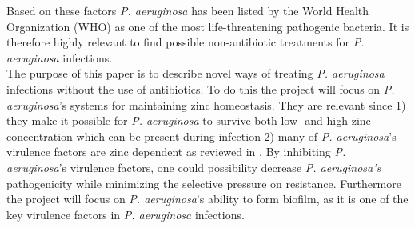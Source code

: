 Based on these factors \textit{P. aeruginosa} has been listed by the World Health Organization (WHO) as one of the most life-threatening pathogenic bacteria\cite{PRIORITIZATIONTUBERCULOSIS}. It is therefore highly relevant to find possible non-antibiotic treatments for \textit{P. aeruginosa} infections.\\ 
The purpose of this paper is to describe novel ways of treating \textit{P. aeruginosa} infections without the use of antibiotics. To do this the project will focus on \textit{P. aeruginosa}'s systems for maintaining zinc homeostasis. They are relevant since 1) they make it possible for \textit{P. aeruginosa} to survive both low- and high zinc concentration which can be present during infection 2) many of \textit{P. aeruginosa}'s virulence factors are zinc dependent as reviewed in \cite{Gonzalez2019PseudomonasPathogen}. By inhibiting \textit{P. aeruginosa}'s virulence factors, one could possibility decrease \textit{P. aeruginosa's} pathogenicity while minimizing the selective pressure on resistance. Furthermore the project will focus on \textit{P. aeruginosa}'s ability to form biofilm, as it is one of the key virulence factors in \textit{P. aeruginosa} infections.
